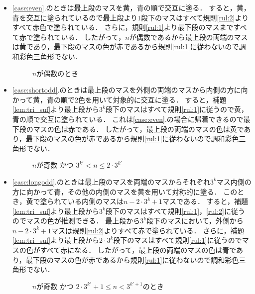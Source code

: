 \begin{itemize}
  \item
    \ref{case:even}.のときは最上段のマスを黄，青の順で交互に塗る．
    すると，黄，青を交互に塗られているので最上段より$1$段下のマスはすべて規則\ref{rul:2}よりすべて赤色で塗られている．
    さらに，規則\ref{rul:1}より最下段のマスまですべて赤で塗られている．
    したがって，$n$が偶数であるから最上段の両端のマスは黄であり，最下段のマスの色が赤であるから規則\ref{rul:1}に従わないので調和彩色三角形でない．\\
    \begin{figure}[h]
      \centering
      
      \caption{$n$が偶数のとき}
      \label{fig:even_steps}
    \end{figure}
  \item
    \ref{case:shortodd}.のときは最上段のマスを外側の両端のマスから内側の方に向かって黄，青の順で$2$色を用いて対象的に交互に塗る．
    すると，補題\ref{lem:tri_suf}より最上段から$3^k$段下のマスはすべて規則\ref{rul:1}に従うので黄，青の順で交互に塗られている．
    これは\ref{case:even}.の場合に帰着できるので最下段のマスの色は赤である．
    したがって，最上段の両端のマスの色は黄であり，最下段のマスの色が赤であるから規則\ref{rul:1}に従わないので調和彩色三角形でない．
    \begin{figure}[h]
      \centering
      
      \caption{$n$が奇数 かつ $3^{k'} < n \leq 2 \cdot 3^{k'}$}
      \label{fig:shortodd_steps}
    \end{figure}
  \item
    \ref{case:longodd}.のときは最上段のマスを両端のマスからそれぞれ$3^k$マス内側の方に向かって青，その他の内側のマスを黄を用いて対称的に塗る．
    このとき，黄で塗られている内側のマスは$n-2\cdot3^k+1$マスである．
    すると，補題\ref{lem:tri_suf}より最上段から$3^k$段下のマスはすべて規則\ref{rul:1}，\ref{rul:2}に従うのでマスの色が推測できる．
    最上段から$3^k$段下のマスにおいて，外側から$n-2\cdot3^k+1$マスは規則\ref{rul:2}よりすべて赤で塗られている．
    さらに，補題\ref{lem:tri_suf}より最上段から$2\cdot3^k$段下のマスはすべて規則\ref{rul:1}に従うのでマスの色がすべて赤になる．
    したがって，最上段の両端のマスの色は青であり，最下段のマスの色が赤であるから規則\ref{rul:1}に従わないので調和彩色三角形でない．
    \begin{figure}[h]
      \centering
      
      \caption{$n$が奇数 かつ $2 \cdot 3^{k'} + 1 \leq n < 3^{k'+1}$のとき}
      \label{fig:longodd_steps}
    \end{figure}
\end{itemize}





